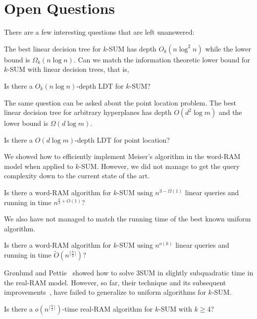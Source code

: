 \section{Open Questions}

There are a few interesting questions that are left unanswered:

The best linear decision tree for \(k\)-SUM has depth \(O_k(n \log^2 n)\) while
the lower bound is \(\Omega_k(n \log n)\).
Can we match the information theoretic lower bound for \(k\)-SUM with linear
decision trees, that is,
\begin{openquestion}
Is there a \(O_k(n \log n)\)-depth LDT for \(k\)-SUM?
\end{openquestion}

The same question can be asked about the point location problem. The best
linear decision tree for arbitrary hyperplanes has depth \(O(d^2 \log m)\) and
the lower bound is \(\Omega(d \log m)\).
\begin{openquestion}
Is there a \(O(d \log m)\)-depth LDT for point location?
\end{openquestion}

We showed how to efficiently implement Meiser's algorithm in the word-RAM model
when applied to \(k\)-SUM. However, we did not manage to get the query
complexity down to the current state of the art.
\begin{openquestion}
Is there a word-RAM algorithm for \(k\)-SUM using \(n^{3 - \Omega(1)}\)
linear queries and running in time \(n^{\frac{k}{2}+O(1)}\)?
\end{openquestion}

We also have not managed to match the running time of the best known uniform
algorithm.
\begin{openquestion}
Is there a word-RAM algorithm for \(k\)-SUM using \(n^{o(k)}\) linear queries and
running in time \( \tilde{O}(n^{\lceil \frac k2 \rceil})\)?
\end{openquestion}

Gr\o nlund and Pettie~\cite{GP18}
showed how to solve 3SUM in slightly subquadratic time in the real-RAM model.
However, so far, their technique and its subsequent
improvements~\cite{Fr15,GS15,Ch18}, have failed to generalize to uniform algorithms
for \(k\)-SUM.
\begin{openquestion}
	Is there a \(o(n^{\lceil \frac k2 \rceil})\)-time real-RAM algorithm for
	\(k\)-SUM with \(k \geq 4\)?
\end{openquestion}
